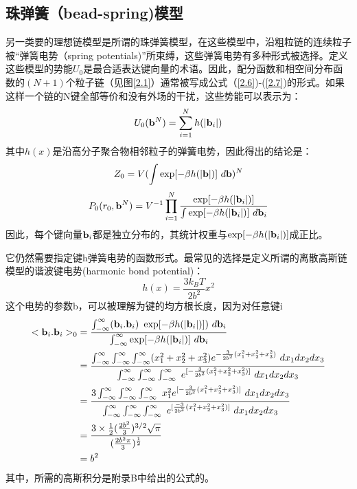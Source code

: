 \subsection{珠弹簧（bead-spring)模型}
\begin{center}
\author{hzj}
\end{center}


另一类要的理想链模型是所谓的珠弹簧模型，在这些模型中，沿粗粒链的连续粒子被“弹簧电势（spring potentials)”所束缚，这些弹簧电势有多种形式被选择。定义这些模型的势能$U_{0}$是最合适表达键向量的术语。因此，配分函数和相空间分布函数的$(N+1)$个粒子链（见图\ref{2.1}）通常被写成公式（\ref{2.6})-(\ref{2.7})的形式。如果这样一个链的N键全部等价和没有外场的干扰，这些势能可以表示为：
\begin{equation}\label{2.26}
U_{0}(\mathbf{b}^{N})= \sum_{i=1}^{N}h(|\mathbf{b}_{i}|)
\end{equation}
其中$h(x)$是沿高分子聚合物相邻粒子的弹簧电势，因此得出的结论是：
\begin{equation}\label{2.27}
Z_{0}=V(\int \exp[-\beta h(|\mathbf{b}|)]~d\mathbf{b})^N 
\end{equation}
\begin{equation}\label{2.28}		
P_{0} (r_{0},\mathbf{b}^N) =V^{-1} \prod_{i=1}^{N} \frac{\exp[-\beta h(|\mathbf{b}_{i}|)]}{\int \exp[-\beta h(|\mathbf{b}_{i}|)]~d \mathbf{b}_{i}}
\end{equation}
因此，每个键向量$\mathbf{b}_{i}$都是独立分布的，其统计权重与$\exp[-\beta h(|\mathbf{b}_{i}|)]$成正比。 

它仍然需要指定键h弹簧电势的函数形式。最常见的选择是定义所谓的离散高斯链模型的谐波键电势(harmonic bond potential)： 
\begin{equation}\label{2.29}
h(x)=\frac{3k_{B}T}{2b^2} x^2  
\end{equation}
这个电势的参数b，可以被理解为键的均方根长度，因为对任意键i 
\begin{equation}\label{2.30}
\begin{aligned}
<\mathbf{b}_{i}.\mathbf{b}_{i}>_{0}&= \frac{\int_{-\infty}^{\infty} (\mathbf{b}_{i}.\mathbf{b}_{i})~\exp[-\beta h(|\mathbf{b}_{i}|)])~d\mathbf{b}_{i}}{\int_{-\infty}^{\infty} \exp[-\beta h(|\mathbf{b}_{i}|)]~d\mathbf{b}_{i}}\\ &=\frac{\int_{-\infty}^{\infty}\int_{-\infty}^{\infty}\int_{-\infty}^{\infty}(x_1^2+x_2^2+x_3^2)e^{-\frac{3}{2b^2}(x_1^2+x_2^2+x_3^2)}~dx_1dx_2dx_3}{\int_{-\infty}^{\infty}\int_{-\infty}^{\infty}\int_{-\infty}^{\infty}~e^{[-\frac{3}{2b^2}(x_1^2+x_2^2+x_3^2)]}~dx_1dx_2dx_3}\\ &=\frac{3\int_{-\infty}^{\infty}\int_{-\infty}^{\infty}\int_{-\infty}^{\infty}~x_1^2e^{[-\frac{3}{2b^2}(x_1^2+x_2^2+x_3^2)]}~dx_1dx_2dx_3}{\int_{-\infty}^{\infty}\int_{-\infty}^{\infty}\int_{-\infty}^{\infty}~e^{[\frac{-3}{2b^2}(x_1^2+x_2^2+x_3^2)]}~dx_1dx_2dx_3}\\ &=\frac{3 \times\frac{1}{2} (\frac{2b^2}{3})^{3/2}\sqrt{\pi}}{(\frac{2b^2\pi}{3})^{\frac{1}{2}}}\\ &=b^2
\end{aligned}
\end{equation}
其中，所需的高斯积分是附录B中给出的公式的。

